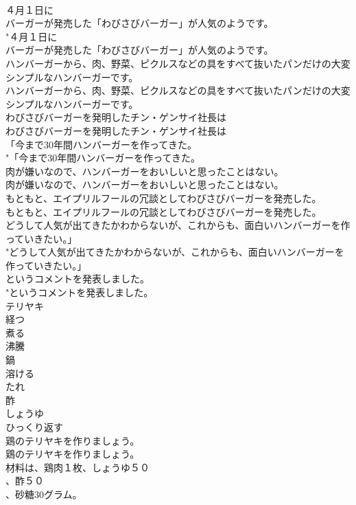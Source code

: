 \documentclass[8pt]{extreport}
\begin{document}
\begin{CJK}{UTF8}{min}
\\	４月１日に
\\	バーガーが発売した「わびさびバーガー」が人気のようです。	
\\	"４月１日に
\\	バーガーが発売した「わびさびバーガー」が人気のようです。 
\\	ハンバーガーから、肉、野菜、ピクルスなどの具をすべて抜いたパンだけの大変シンプルなハンバーガーです。	
\\	ハンバーガーから、肉、野菜、ピクルスなどの具をすべて抜いたパンだけの大変シンプルなハンバーガーです。 
\\	わびさびバーガーを発明したチン・ゲンサイ社長は	
\\	わびさびバーガーを発明したチン・ゲンサイ社長は 
\\	「今まで30年間ハンバーガーを作ってきた。	
\\	"「今まで30年間ハンバーガーを作ってきた。 
\\	肉が嫌いなので、ハンバーガーをおいしいと思ったことはない。	
\\	肉が嫌いなので、ハンバーガーをおいしいと思ったことはない。 
\\	もともと、エイプリルフールの冗談としてわびさびバーガーを発売した。	
\\	もともと、エイプリルフールの冗談としてわびさびバーガーを発売した。 
\\	どうして人気が出てきたかわからないが、これからも、面白いハンバーガーを作っていきたい。」	
\\	"どうして人気が出てきたかわからないが、これからも、面白いハンバーガーを作っていきたい。」 
\\	というコメントを発表しました。	
\\	"というコメントを発表しました。 
\\	テリヤキ
\\	経つ
\\	煮る
\\	沸騰
\\	鍋
\\	溶ける
\\	たれ
\\	酢
\\	しょうゆ
\\	ひっくり返す
\\	鶏のテリヤキを作りましょう。	
\\	鶏のテリヤキを作りましょう。 
\\	材料は、鶏肉１枚、しょうゆ５０
\\	、酢５０
\\	、砂糖30グラム。	

\end{CJK}
\end{document}
